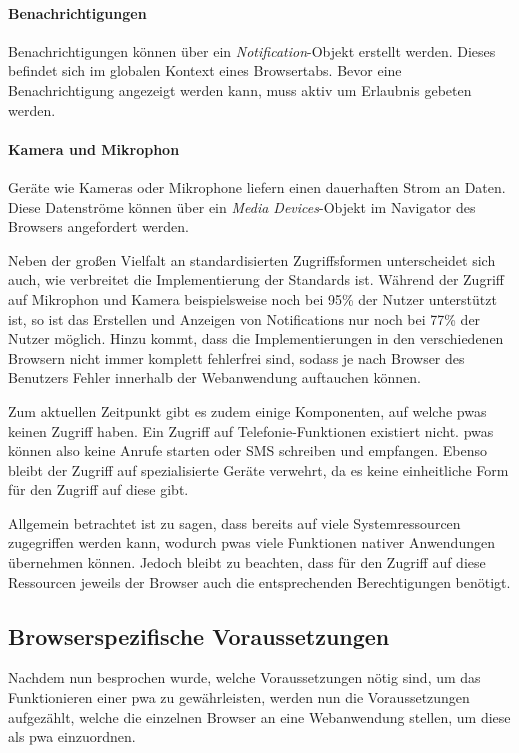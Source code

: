 \documentclass[12pt, parskip=half]{scrartcl}       %
\begin{document}
\paragraph{Benachrichtigungen} Benachrichtigungen können über ein \textit{Notification}-Objekt erstellt werden.
Dieses befindet sich im globalen Kontext eines Browsertabs.
Bevor eine Benachrichtigung angezeigt werden kann, muss aktiv um Erlaubnis gebeten werden\cite{whatwg_notification}.

\paragraph{Kamera und Mikrophon} Geräte wie Kameras oder Mikrophone liefern einen dauerhaften Strom an Daten.
Diese Datenströme können über ein \textit{Media Devices}-Objekt im Navigator des Browsers angefordert werden\cite{w3c_mediacapture}.

Neben der großen Vielfalt an standardisierten Zugriffsformen unterscheidet sich auch, wie verbreitet die Implementierung der Standards ist.
Während der Zugriff auf Mikrophon und Kamera beispielsweise noch bei 95\% der Nutzer unterstützt ist, so ist das Erstellen und Anzeigen von Notifications nur noch bei 77\% der Nutzer möglich\cite{caniuse}.
Hinzu kommt, dass die Implementierungen in den verschiedenen Browsern nicht immer komplett fehlerfrei sind, sodass je nach Browser des Benutzers Fehler innerhalb der Webanwendung auftauchen können.

Zum aktuellen Zeitpunkt gibt es zudem einige Komponenten, auf welche \acp{pwa} keinen Zugriff haben.
Ein Zugriff auf Telefonie-Funktionen existiert nicht.
\acp{pwa} können also keine Anrufe starten oder SMS schreiben und empfangen.
Ebenso bleibt der Zugriff auf spezialisierte Geräte verwehrt, da es keine einheitliche Form für den Zugriff auf diese gibt.

Allgemein betrachtet ist zu sagen, dass bereits auf viele Systemressourcen zugegriffen werden kann, wodurch \acp{pwa} viele Funktionen nativer Anwendungen übernehmen können.
Jedoch bleibt zu beachten, dass für den Zugriff auf diese Ressourcen jeweils der Browser auch die entsprechenden Berechtigungen benötigt.


\subsection{Browserspezifische Voraussetzungen}

Nachdem nun besprochen wurde, welche Voraussetzungen nötig sind, um das Funktionieren einer \ac{pwa} zu gewährleisten, werden nun die Voraussetzungen aufgezählt, welche die einzelnen Browser an eine Webanwendung stellen, um diese als \ac{pwa} einzuordnen.
\end{document}
